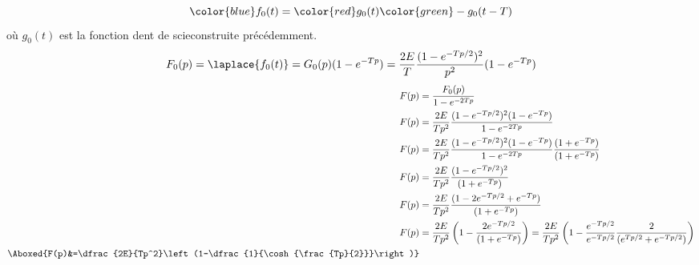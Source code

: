$$
\color{blue}f_0(t)=\color{red}g_0(t)\color{green}-g_0(t-T)
$$
où $g_0(t)$ est la fonction \og dent de scie\fg construite précédemment.
$$
F_0(p)=\laplace{f_0(t)}=G_0(p)(1-e^{-Tp})
=\dfrac{2E}{T}\dfrac{(1-e^{-Tp/2})^2}{p^2}(1-e^{-Tp})
$$
\begin{align*}
    F(p)&=\dfrac{F_0(p)}{1-e^{-2Tp}} \\
    F(p)&=\dfrac{2E}{Tp^2}\dfrac{(1-e^{-Tp/2})^2(1-e^{-Tp})}{1-e^{-2Tp}}\\
    F(p)&=\dfrac{2E}{Tp^2}\dfrac{(1-e^{-Tp/2})^2(1-e^{-Tp})}{1-e^{-2Tp}}
                          \dfrac{(1+e^{-Tp})}{(1+e^{-Tp})}\\
    F(p)&=\dfrac{2E}{Tp^2}\dfrac{(1-e^{-Tp/2})^2}{(1+e^{-Tp})}\\
    F(p)&=\dfrac{2E}{Tp^2}\dfrac{(1-2e^{-Tp/2}+e^{-Tp})}{(1+e^{-Tp})}\\
    F(p)&=\dfrac{2E}{Tp^2}\left(1-\dfrac{2e^{-Tp/2}}{(1+e^{-Tp})}\right)
         =\dfrac{2E}{Tp^2}\left(1-\dfrac{e^{-Tp/2}}{e^{-Tp/2}}
                                  \dfrac{2}{(e^{Tp/2}+e^{-Tp/2})}\right)\\
\Aboxed{F(p)&=\dfrac{2E}{Tp^2}\left(1-\dfrac{1}{\cosh{\frac{Tp}{2}}}\right)}
\end{align*}



